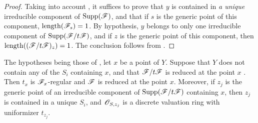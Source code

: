 \begin{proof}
Taking into account , it suffices to prove that $y$ is contained in \emph{a unique} irreducible component of $\operatorname{Supp}(\mathscr{F})$, and that if $s$ is the generic point of this component, $\operatorname{length}(\mathscr{F}_s)=1$.
By hypothesis, $y$ belongs to only one irreducible component of $\operatorname{Supp}(\mathscr{F}/t\mathscr{F})$, and if $z$ is the generic point of this component, then $\operatorname{length}((\mathscr{F}/t\mathscr{F})_z)=1$.
The conclusion follows from .
\end{proof}

\begin{proposition}[3.4.6]
\label{IV.3.4.6}
The hypotheses being those of , let $x$ be a point of $Y$.
Suppose that $Y$ does not contain any of the $S_i$ containing $x$, and that $\mathscr{F}/t\mathscr{F}$ is reduced at the point $x$ .
Then $t_x$ is $\mathscr{F}_x$-regular and $\mathscr{F}$ is reduced at the point $x$.
Moreover, if $z_j$ is the generic point of an irreducible component of $\operatorname{Supp}(\mathscr{F}/t\mathscr{F})$ containing $x$, then $z_j$ is contained in a unique $S_i$, and $\mathscr{O}_{S,z_j}$ is a discrete valuation ring with uniformizer $t_{z_j}$.
\end{proposition}

